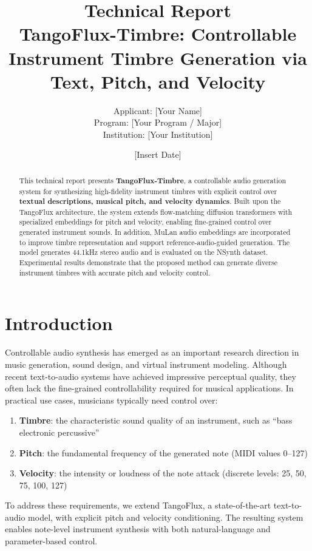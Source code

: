 \documentclass[11pt,a4paper]{article}
\title{\textbf{Technical Report} \\[0.5em]
\large TangoFlux-Timbre: Controllable Instrument Timbre Generation via Text, Pitch, and Velocity}
\author{Applicant: [Your Name] \\ Program: [Your Program / Major] \\ Institution: [Your Institution]}
\date{[Insert Date]}
\begin{document}
\maketitle

\begin{abstract}
This technical report presents \textbf{TangoFlux-Timbre}, a controllable audio generation system for synthesizing high-fidelity instrument timbres with explicit control over \textbf{textual descriptions, musical pitch, and velocity dynamics}. Built upon the TangoFlux architecture, the system extends flow-matching diffusion transformers with specialized embeddings for pitch and velocity, enabling fine-grained control over generated instrument sounds. In addition, MuLan audio embeddings are incorporated to improve timbre representation and support reference-audio-guided generation. The model generates 44.1kHz stereo audio and is evaluated on the NSynth dataset. Experimental results demonstrate that the proposed method can generate diverse instrument timbres with accurate pitch and velocity control.
\end{abstract}

\section{Introduction}

Controllable audio synthesis has emerged as an important research direction in music generation, sound design, and virtual instrument modeling. Although recent text-to-audio systems have achieved impressive perceptual quality, they often lack the fine-grained controllability required for musical applications. In practical use cases, musicians typically need control over:

\begin{enumerate}[leftmargin=1.5em]
    \item \textbf{Timbre}: the characteristic sound quality of an instrument, such as ``bass electronic percussive''
    \item \textbf{Pitch}: the fundamental frequency of the generated note (MIDI values 0--127)
    \item \textbf{Velocity}: the intensity or loudness of the note attack (discrete levels: 25, 50, 75, 100, 127)
\end{enumerate}

To address these requirements, we extend TangoFlux, a state-of-the-art text-to-audio model, with explicit pitch and velocity conditioning. The resulting system enables note-level instrument synthesis with both natural-language and parameter-based control.
\end{document}
